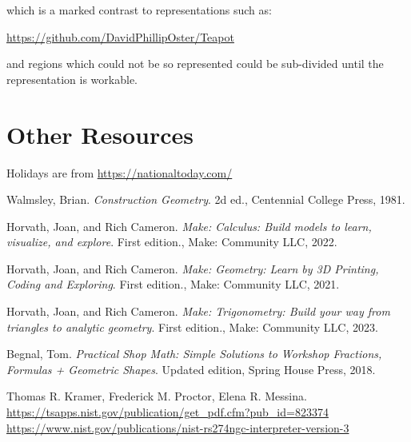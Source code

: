 \documentclass{ltxdoc}
\begin{document}
\noindent which is a marked contrast to representations such as:
 
\url{https://github.com/DavidPhillipOster/Teapot}

\noindent and regions which could not be so represented could be sub-divided until the 
representation is workable.

\section{Other Resources}
 
Holidays are from \url{https://nationaltoday.com/}

 


\begin{thebibliography}{RS274}

Walmsley, Brian. \emph{Construction Geometry}. 2d ed., Centennial College Press, 1981.
 
Horvath, Joan, and Rich Cameron. 
\emph{Make: Calculus: Build models to learn, visualize, and explore}. First edition., 
Make: Community LLC, 2022.
 
Horvath, Joan, and Rich Cameron. 
\emph{Make: Geometry: Learn by 3D Printing, Coding and Exploring}. First edition., 
Make: Community LLC, 2021.

Horvath, Joan, and Rich Cameron. 
\emph{Make: Trigonometry: Build your way from triangles to analytic geometry}. First edition., 
Make: Community LLC, 2023.
 
Begnal, Tom. \emph{Practical Shop Math: Simple Solutions to Workshop Fractions, Formulas + Geometric Shapes}. Updated edition, Spring House Press, 2018.
 
Thomas R. Kramer, Frederick M. Proctor, Elena R. Messina.\\
\mbox{\url{https://tsapps.nist.gov/publication/get_pdf.cfm?pub_id=823374}}\\
\url{https://www.nist.gov/publications/nist-rs274ngc-interpreter-version-3}

\end{thebibliography}



\DoNotIndex{\\\\,\\~,\n,\Users,\RapCAD}
 
\PrintIndex

\end{document}
